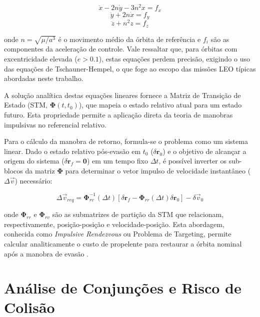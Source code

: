 \begin{equation} \label{eq:hcw_x}
    \ddot{x} - 2n\dot{y} - 3n^2x = f_x
\end{equation}
\begin{equation} \label{eq:hcw_y}
    \ddot{y} + 2n\dot{x} = f_y
\end{equation}
\begin{equation} \label{eq:hcw_z}
    \ddot{z} + n^2z = f_z
\end{equation}

\noindent onde $n = \sqrt{\mu/a^3}$ é o movimento médio da órbita de referência e $f_i$ são as componentes da aceleração de controle. Vale ressaltar que, para órbitas com excentricidade elevada ($e > 0.1$), estas equações perdem precisão, exigindo o uso das equações de Tschauner-Hempel, o que foge ao escopo das missões LEO típicas abordadas neste trabalho.

A solução analítica destas equações lineares fornece a Matriz de Transição de Estado (STM, $\mathbf{\Phi}(t, t_0)$), que mapeia o estado relativo atual para um estado futuro. Esta propriedade permite a aplicação direta da teoria de manobras impulsivas no referencial relativo.

Para o cálculo da manobra de retorno, formula-se o problema como um sistema linear. Dado o estado relativo pós-evasão em $t_0$ ($\delta \mathbf{r}_0$) e o objetivo de alcançar a origem do sistema ($\delta \mathbf{r}_f = \mathbf{0}$) em um tempo fixo $\Delta t$, é possível inverter os sub-blocos da matriz $\mathbf{\Phi}$ para determinar o vetor impulso de velocidade instantâneo ($\Delta \vec{v}$) necessário:

\begin{equation}
    \Delta \vec{v}_{req} = \mathbf{\Phi}_{rv}^{-1} (\Delta t) \left[ \delta \mathbf{r}_f - \mathbf{\Phi}_{rr}(\Delta t) \delta \mathbf{r}_0 \right] - \delta \vec{v}_0
\end{equation}

\noindent onde $\mathbf{\Phi}_{rr}$ e $\mathbf{\Phi}_{rv}$ são as submatrizes de partição da STM que relacionam, respectivamente, posição-posição e velocidade-posição. Esta abordagem, conhecida como \textit{Impulsive Rendezvous} ou Problema de Targeting, permite calcular analiticamente o custo de propelente para restaurar a órbita nominal após a manobra de evasão \cite{Alfriend2010, Vallado2013}.

\section{Análise de Conjunções e Risco de Colisão}
\label{sec:analise_conjuncao_risco}

